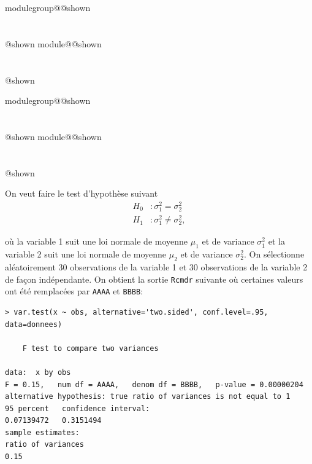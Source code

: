 \documentclass{Evaluation}
\makeatletter
\newcommand{\currentmodulekey}{}
\newcommand{\currentmoduletitle}{}
\newcommand{\currentgroupkey}{}
\newcommand{\currentgrouptitle}{}
\newcommand{\showmoduleifneeded}{%
  \ifx\currentgroupkey\empty\else
    \expandafter\ifx\csname modulegroup@\currentgroupkey @shown\endcsname\relax
      \section*{\currentgrouptitle}%
      \expandafter\gdef\csname modulegroup@\currentgroupkey @shown\endcsname{1}%
    \fi
  \fi
  \expandafter\ifx\csname module@\currentmodulekey @shown\endcsname\relax
    \section*{\currentmoduletitle}%
    \expandafter\gdef\csname module@\currentmodulekey @shown\endcsname{1}%
  \fi
}
\newenvironment{A22}{\showmoduleifneeded}{}
\newenvironment{H23}{\showmoduleifneeded}{}
\makeatother
\begin{document}
\begin{questions}
\begin{A22}
\end{A22}

\begin{H23}
\question {} %

On veut faire le test d'hypothèse suivant
\begin{align*}
H_0 &:\sigma_1^2 = \sigma_2^2\\
H_1 &:\sigma_1^2 \neq \sigma_2^2,
\end{align*}

où la variable 1 suit une loi normale de moyenne $\mu_1$ et de variance $\sigma_1^2$ et la variable 2 suit une loi normale de moyenne $\mu_2$ et de variance $\sigma_2^2$. On sélectionne aléatoirement 30 observations de la variable 1 et 30 observations de la variable 2 de façon indépendante. On obtient la sortie \texttt{Rcmdr} suivante où certaines valeurs ont été remplacées par \texttt{AAAA} et \texttt{BBBB}:

\begin{verbatim}
> var.test(x ~ obs, alternative='two.sided', conf.level=.95, data=donnees)

	F test to compare two variances

data:  x by obs
F = 0.15,   num df = AAAA,   denom df = BBBB,   p-value = 0.00000204
alternative hypothesis: true ratio of variances is not equal to 1
95 percent   confidence interval:
0.07139472   0.3151494
sample estimates:
ratio of variances
0.15
\end{verbatim}

\end{H23}
\end{questions}
\end{document}
